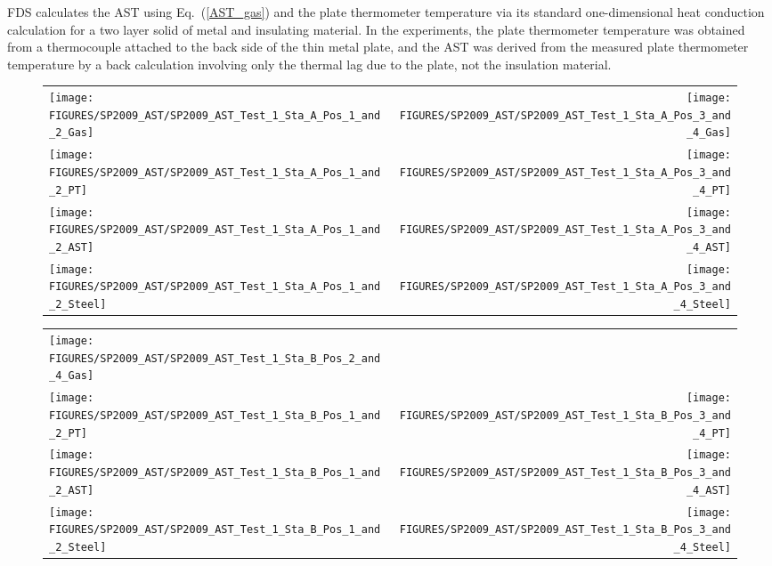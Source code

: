 FDS calculates the AST using Eq.~(\ref{AST_gas}) and the plate thermometer temperature via its standard one-dimensional heat conduction calculation for a
two layer solid of metal and insulating material. In the experiments, the plate thermometer temperature was obtained from a thermocouple attached to the back side of
the thin metal plate, and the AST was derived from the measured plate thermometer temperature by a back calculation involving only the thermal lag due to the
plate, not the insulation material.


\begin{figure}[p]
\begin{tabular*}{\textwidth}{l@{\extracolsep{\fill}}r}
\texttt{[image: FIGURES/SP2009\_AST/SP2009\_AST\_Test\_1\_Sta\_A\_Pos\_1\_and\_2\_Gas]} &
\texttt{[image: FIGURES/SP2009\_AST/SP2009\_AST\_Test\_1\_Sta\_A\_Pos\_3\_and\_4\_Gas]} \\
\texttt{[image: FIGURES/SP2009\_AST/SP2009\_AST\_Test\_1\_Sta\_A\_Pos\_1\_and\_2\_PT]} &
\texttt{[image: FIGURES/SP2009\_AST/SP2009\_AST\_Test\_1\_Sta\_A\_Pos\_3\_and\_4\_PT]} \\
\texttt{[image: FIGURES/SP2009\_AST/SP2009\_AST\_Test\_1\_Sta\_A\_Pos\_1\_and\_2\_AST]} &
\texttt{[image: FIGURES/SP2009\_AST/SP2009\_AST\_Test\_1\_Sta\_A\_Pos\_3\_and\_4\_AST]} \\
\texttt{[image: FIGURES/SP2009\_AST/SP2009\_AST\_Test\_1\_Sta\_A\_Pos\_1\_and\_2\_Steel]} &
\texttt{[image: FIGURES/SP2009\_AST/SP2009\_AST\_Test\_1\_Sta\_A\_Pos\_3\_and\_4\_Steel]}
\end{tabular*}
\label{SP_Test_1_Station_A}
\end{figure}

\begin{figure}[p]
\begin{tabular*}{\textwidth}{l@{\extracolsep{\fill}}r}
\texttt{[image: FIGURES/SP2009\_AST/SP2009\_AST\_Test\_1\_Sta\_B\_Pos\_2\_and\_4\_Gas]} &
  \\
\texttt{[image: FIGURES/SP2009\_AST/SP2009\_AST\_Test\_1\_Sta\_B\_Pos\_1\_and\_2\_PT]} &
\texttt{[image: FIGURES/SP2009\_AST/SP2009\_AST\_Test\_1\_Sta\_B\_Pos\_3\_and\_4\_PT]} \\
\texttt{[image: FIGURES/SP2009\_AST/SP2009\_AST\_Test\_1\_Sta\_B\_Pos\_1\_and\_2\_AST]} &
\texttt{[image: FIGURES/SP2009\_AST/SP2009\_AST\_Test\_1\_Sta\_B\_Pos\_3\_and\_4\_AST]} \\
\texttt{[image: FIGURES/SP2009\_AST/SP2009\_AST\_Test\_1\_Sta\_B\_Pos\_1\_and\_2\_Steel]} &
\texttt{[image: FIGURES/SP2009\_AST/SP2009\_AST\_Test\_1\_Sta\_B\_Pos\_3\_and\_4\_Steel]}
\end{tabular*}
\label{SP_Test_1_Station_B}
\end{figure}


